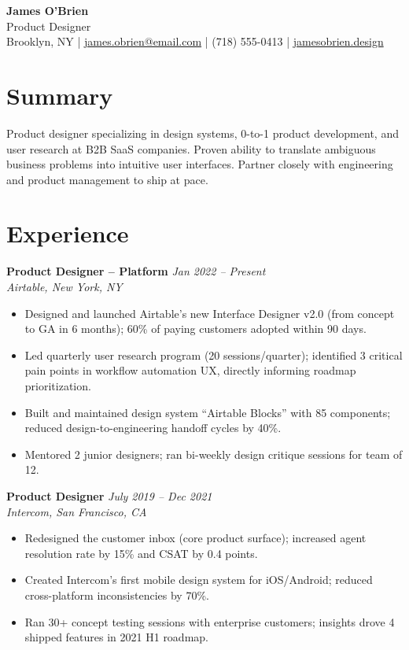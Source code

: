 \documentclass[11pt,a4paper]{article}
\begin{document}
\begin{center}
  {\LARGE \textbf{James O'Brien}}\\[3pt]
  {\large \textcolor{accent}{Product Designer}}\\[4pt]
  Brooklyn, NY \quad|\quad
  \href{mailto:james.obrien@email.com}{james.obrien@email.com} \quad|\quad
  (718) 555-0413 \quad|\quad
  \href{https://jamesobrien.design}{jamesobrien.design}
\end{center}

\section{Summary}
Product designer specializing in design systems, 0-to-1 product development, and user research at B2B SaaS companies. Proven ability to translate ambiguous business problems into intuitive user interfaces. Partner closely with engineering and product management to ship at pace.

\section{Experience}

\noindent\textbf{Product Designer -- Platform} \hfill \textit{Jan 2022 -- Present}\\
\textit{Airtable, New York, NY}
\begin{itemize}
  \item Designed and launched Airtable's new Interface Designer v2.0 (from concept to GA in 6 months); 60\% of paying customers adopted within 90 days.
  \item Led quarterly user research program (20 sessions/quarter); identified 3 critical pain points in workflow automation UX, directly informing roadmap prioritization.
  \item Built and maintained design system ``Airtable Blocks'' with 85 components; reduced design-to-engineering handoff cycles by 40\%.
  \item Mentored 2 junior designers; ran bi-weekly design critique sessions for team of 12.
\end{itemize}

\vspace{4pt}
\noindent\textbf{Product Designer} \hfill \textit{July 2019 -- Dec 2021}\\
\textit{Intercom, San Francisco, CA}
\begin{itemize}
  \item Redesigned the customer inbox (core product surface); increased agent resolution rate by 15\% and CSAT by 0.4 points.
  \item Created Intercom's first mobile design system for iOS/Android; reduced cross-platform inconsistencies by 70\%.
  \item Ran 30+ concept testing sessions with enterprise customers; insights drove 4 shipped features in 2021 H1 roadmap.
\end{itemize}
\end{document}
